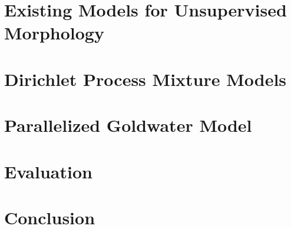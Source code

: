 \documentclass{article}
\begin{document}


\section{Existing Models for Unsupervised Morphology}
\label{sec:existing-models}



\section{Dirichlet Process Mixture Models}
\label{sec:dpmm}



\section{Parallelized Goldwater Model}
\label{sec:parallel-goldwater}



\section{Evaluation}
\label{sec:evaluation}



\section{Conclusion}
\label{sec:conclusion}





\end{document}
